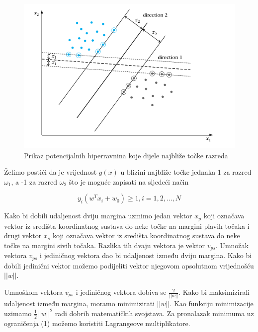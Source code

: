 \documentclass[times, utf8, zavrsni, numeric]{fer}
\begin{document}
\begin{figure}[htbp]
\centering
\includegraphics[scale=0.5]{img/slika10.png}
\caption{Prikaz potencijalnih hiperravnina koje dijele najbliže točke razreda}
\end{figure}

\newpage

Želimo postići da je vrijednost \(g(x)\) u blizini najbliže točke jednaka 1 za razred \(\omega_1\), a
-1 za razred \(\omega_2\) što je moguće zapisati na sljedeći način

\begin{equation}
y_i(w^Tx_i + w_0) \ge 1, i = 1,2,...,N
\end{equation}

Kako bi dobili udaljenost dviju margina uzmimo jedan vektor \(x_p\) koji označava 
vektor iz središta koordinatnog sustava do neke točke na margini plavih točaka i 
drugi vektor \(x_s\) koji označava vektor iz središta koordinatnog sustava do neke točke 
na margini sivih točaka. Razlika tih dvaju vektora je vektor \(v_{ps}\). Umnožak vektora 
\(v_{ps}\) i jediničnog vektora dao bi udaljenost između dviju margina. Kako bi dobili 
jedinični vektor možemo podijeliti vektor  njegovom apsolutnom vrijednošću \(\left| \left| w \right| \right|\). 

\bigbreak

Umnoškom vektora \(v_{ps}\) i jediničnog vektora dobiva se \(\frac{2}{\left| \left| w \right| \right|}\).
Kako bi maksimizirali udaljenost između margina, moramo minimizirati \(\left| \left| w \right| \right|\). 
Kao funkciju minimizacije uzimamo \(\frac{1}{2}\left| \left| w \right| \right|^2\) radi dobrih matematičkih
svojstava. Za pronalazak minimuma uz ograničenja (1) možemo koristiti Lagrangeove multiplikatore. 
\end{document}
